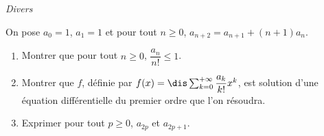 \documentclass[a4paper,10pt]{report}
\begin{document}
\medskip

\begin{center}
\textit{{ {\large Divers}}}
\end{center}

\medskip


\begin{Exercice}{} On pose $a_0=1$, $a_1=1$ et pour tout $n \geq 0$, $a_{n+2} = a_{n+1} + (n+1)a_n$.
\begin{enumerate}
\item Montrer que pour tout $n \geq 0$, $\dfrac{a_n}{n!} \leq 1$.
\item Montrer que $f$, définie par $f(x) = \dis \sum_{k=0}^{+ \infty} \dfrac{a_k}{k!}x^k$, est solution d'une équation différentielle du premier ordre que l'on résoudra.
\item Exprimer pour tout $p \geq 0$, $a_{2p}$ et $a_{2p+1}$.
\end{enumerate}
\end{Exercice}
\end{document}
